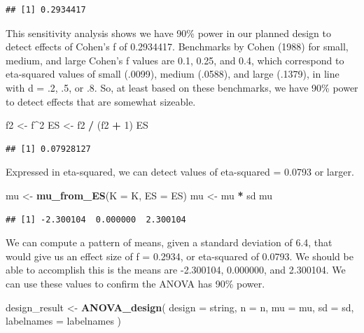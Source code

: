\documentclass[]{book}
\newenvironment{Shaded}{\begin{snugshade}}{\end{snugshade}}
\newcommand{\DataTypeTok}[1]{\textcolor[rgb]{0.13,0.29,0.53}{#1}}
\newcommand{\DecValTok}[1]{\textcolor[rgb]{0.00,0.00,0.81}{#1}}
\newcommand{\KeywordTok}[1]{\textcolor[rgb]{0.13,0.29,0.53}{\textbf{#1}}}
\newcommand{\NormalTok}[1]{#1}
\newcommand{\OperatorTok}[1]{\textcolor[rgb]{0.81,0.36,0.00}{\textbf{#1}}}
\newcommand{\StringTok}[1]{\textcolor[rgb]{0.31,0.60,0.02}{#1}}
\begin{document}
\begin{verbatim}
## [1] 0.2934417
\end{verbatim}

This sensitivity analysis shows we have 90\% power in our planned design to detect effects of Cohen's f of 0.2934417. Benchmarks by Cohen (1988) for small, medium, and large Cohen's f values are 0.1, 0.25, and 0.4, which correspond to eta-squared values of small (.0099), medium (.0588), and large (.1379), in line with d = .2, .5, or .8. So, at least based on these benchmarks, we have 90\% power to detect effects that are somewhat sizeable.

\begin{Shaded}
\begin{Highlighting}[]
\NormalTok{f2 <-}\StringTok{ }\NormalTok{f}\OperatorTok{^}\DecValTok{2}
\NormalTok{ES <-}\StringTok{ }\NormalTok{f2 }\OperatorTok{/}\StringTok{ }\NormalTok{(f2 }\OperatorTok{+}\StringTok{ }\DecValTok{1}\NormalTok{)}
\NormalTok{ES}
\end{Highlighting}
\end{Shaded}

\begin{verbatim}
## [1] 0.07928127
\end{verbatim}

Expressed in eta-squared, we can detect values of eta-squared = 0.0793 or larger.

\begin{Shaded}
\begin{Highlighting}[]
\NormalTok{mu <-}\StringTok{ }\KeywordTok{mu_from_ES}\NormalTok{(}\DataTypeTok{K =}\NormalTok{ K, }\DataTypeTok{ES =}\NormalTok{ ES)}
\NormalTok{mu <-}\StringTok{ }\NormalTok{mu }\OperatorTok{*}\StringTok{ }\NormalTok{sd}
\NormalTok{mu}
\end{Highlighting}
\end{Shaded}

\begin{verbatim}
## [1] -2.300104  0.000000  2.300104
\end{verbatim}

We can compute a pattern of means, given a standard deviation of 6.4, that would give us an effect size of f = 0.2934, or eta-squared of 0.0793. We should be able to accomplish this is the means are -2.300104, 0.000000, and 2.300104. We can use these values to confirm the ANOVA has 90\% power.

\begin{Shaded}
\begin{Highlighting}[]
\NormalTok{design_result <-}\StringTok{ }\KeywordTok{ANOVA_design}\NormalTok{(}
  \DataTypeTok{design =}\NormalTok{ string,}
  \DataTypeTok{n =}\NormalTok{ n,}
  \DataTypeTok{mu =}\NormalTok{ mu,}
  \DataTypeTok{sd =}\NormalTok{ sd,}
  \DataTypeTok{labelnames =}\NormalTok{ labelnames}
\NormalTok{  )}
\end{Highlighting}
\end{Shaded}
\end{document}
